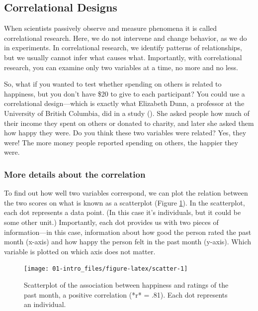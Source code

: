 \documentclass[
]{krantz}
\begin{document}
\subsection*{Correlational Designs}\label{correlational-designs}


When scientists passively observe and measure phenomena it is called correlational research. Here, we do not intervene and change behavior, as we do in experiments. In correlational research, we identify patterns of relationships, but we usually cannot infer what causes what. Importantly, with correlational research, you can examine only two variables at a time, no more and no less.

So, what if you wanted to test whether spending on others is related to happiness, but you don't have \$20 to give to each participant? You could use a correlational design---which is exactly what Elizabeth Dunn, a professor at the University of British Columbia, did in a study (). She asked people how much of their income they spent on others or donated to charity, and later she asked them how happy they were. Do you think these two variables were related? Yes, they were! The more money people reported spending on others, the happier they were.

\subsubsection*{More details about the correlation}\label{more-details-about-the-correlation}


To find out how well two variables correspond, we can plot the relation between the two scores on what is known as a scatterplot (Figure \ref{fig:scatter}). In the scatterplot, each dot represents a data point. (In this case it's individuals, but it could be some other unit.) Importantly, each dot provides us with two pieces of information---in this case, information about how good the person rated the past month (x-axis) and how happy the person felt in the past month (y-axis). Which variable is plotted on which axis does not matter.

\begin{figure}

{\centering \texttt{[image: 01-intro\_files/figure-latex/scatter-1]} 

}

\caption{Scatterplot of the association between happiness and ratings of the past month, a positive correlation (*r* = .81). Each dot represents an individual.}\label{fig:scatter}
\end{figure}
\end{document}
